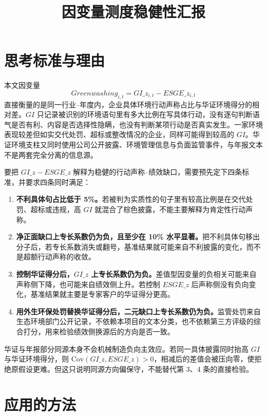 \documentclass[12pt,a4paper]{article}
\title{因变量测度稳健性汇报}
\author{}
\date{}
\begin{document}
\maketitle

\section{思考标准与理由}

本文因变量
\begin{equation}
Greenwashing_{i,t}=GI\_z_{i,t}-ESGE\_z_{i,t}
\end{equation}
直接衡量的是同一行业--年度内，企业具体环境行动声称占比与华证环境得分的相对差。$GI$ 只记录被识别的环境语句里有多大比例在写具体行动，没有逐句判断语气是否有利、内容是否选择性隐瞒，也没有判断某项行动是否真实发生。一家环境表现较差但如实交代处罚、超标或整改情况的企业，同样可能得到较高的 $GI$。华证环境支柱又同时使用公司公开披露、环境管理信息与负面监管事件，与年报文本不是两套完全分离的信息源。

要把 $GI\_z-ESGE\_z$ 解释为稳健的行动声称--绩效缺口，需要预先定下四条标准，并要求四条同时满足：

\begin{enumerate}
\item \textbf{不利具体句占比低于 5\%。}若被判为实质性的句子里有较高比例是在交代处罚、超标或违规，高 $GI$ 就混合了棕色披露，不能主要解释为肯定性行动声称。
\item \textbf{净正面缺口上专长系数仍为负，且至少在 10\% 水平显著。}把不利具体句移出分子后，若专长系数消失或翻号，基准结果就可能来自不利披露的变化，而不是超额行动声称的收敛。
\item \textbf{控制华证得分后，$GI\_z$ 上专长系数仍为负。}差值型因变量的负相关可能来自声称侧下降，也可能来自绩效侧上升。若控制 $ESGE\_z$ 后声称侧没有负向变化，基准结果就主要是专家客户的华证得分更高。
\item \textbf{用外生环保处罚替换华证得分后，二元缺口上专长系数仍为负。}监管处罚来自生态环境部门公开记录，不依赖本项目的文本分类，也不依赖第三方评级的综合打分，用来检验绩效侧换源后的方向是否一致。
\end{enumerate}

华证与年报部分同源本身不会机械制造负向主效应。若同一具体披露同时抬高 $GI$ 与华证环境得分，则 $\mathrm{Cov}(GI\_z,ESGE\_z)>0$，相减后的差值会被压向零，使拒绝原假设更难。但这只说明同源方向偏保守，不能替代第 3、4 条的直接检验。

\section{应用的方法}
\end{document}
